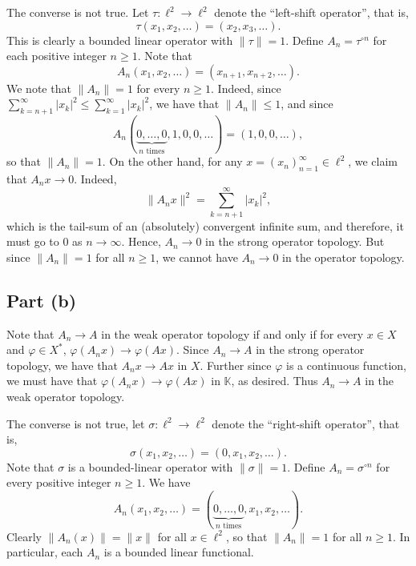 \documentclass[11pt]{article}
\theoremstyle{thmstyle}
\theoremstyle{defstyle}
\newcommand{\R}{\mathbb{R}}
\newcommand{\bbC}{\mathbb{C}}
\newcommand{\K}{\mathbb{K}} %
\renewcommand{\le}{\leqslant}
\renewcommand{\ge}{\geqslant}
\begin{document}
The converse is not true. Let $\tau\colon\ell^2\to\ell^2$ denote the ``left-shift operator'', that is, 
\begin{equation*}
    \tau(x_1, x_2, \dots) = \left(x_2, x_3,  \dots\right).
\end{equation*}
This is clearly a bounded linear operator with $\|\tau\| = 1$. Define $A_n = \tau^{\circ n}$ for each positive integer $n\ge 1$. Note that 
\begin{equation*}
    A_n\left(x_1, x_2, \dots\right) = \left(x_{n + 1}, x_{n + 2},\dots\right).
\end{equation*}
We note that $\|A_n\| = 1$ for every $n\ge 1$. Indeed, since $\displaystyle\sum_{k = n + 1}^\infty |x_k|^2\le\sum_{k = 1}^\infty |x_k|^2$, we have that $\|A_n\|\le 1$, and since 
\begin{equation*}
    A_n(\underbrace{0, \dots, 0}_{n\text{ times}}, 1, 0, 0, \dots) = \left(1, 0, 0, \dots\right),
\end{equation*}
so that $\|A_n\| = 1$. On the other hand, for any $x = (x_n)_{n = 1}^\infty\in\ell^2$, we claim that $A_n x\to 0$. Indeed, 
\begin{equation*}
    \|A_n x\|^2 = \sum_{k = n + 1}^\infty |x_k|^2,
\end{equation*}
which is the tail-sum of an (absolutely) convergent infinite sum, and therefore, it must go to $0$ as $n\to\infty$. Hence, $A_n\to 0$ in the strong operator topology. But since $\|A_n\| = 1$ for all $n\ge 1$, we cannot have $A_n\to 0$ in the operator topology.

\subsection{Part (b)}

Note that $A_n\to A$ in the weak operator topology if and only if for every $x\in X$ and $\varphi\in X^\ast$, $\varphi(A_n x)\to \varphi(Ax)$. Since $A_n\to A$ in the strong operator topology, we have that $A_nx\to Ax$ in $X$. Further since $\varphi$ is a continuous function, we must have that $\varphi(A_n x)\to \varphi(Ax)$ in $\K$, as desired. Thus $A_n\to A$ in the weak operator topology.

The converse is not true, let $\sigma\colon \ell^2\to\ell^2$ denote the ``right-shift operator'', that is, 
\begin{equation*}
\sigma(x_1, x_2, \dots) = (0, x_1, x_2, \dots).
\end{equation*}
Note that $\sigma$ is a bounded-linear operator with $\|\sigma\| = 1$. Define $A_n = \sigma^{\circ n}$ for every positive integer $n\ge 1$. We have 
\begin{equation*}
    A_n(x_1, x_2,\dots) = (\underbrace{0, \dots, 0}_{n\text{ times}}, x_1, x_2, \dots).
\end{equation*}
Clearly $\|A_n(x)\| = \|x\|$ for all $x\in\ell^2$, so that $\|A_n\| = 1$ for all $n\ge 1$. In particular, each $A_n$ is a bounded linear functional. 
\end{document}
